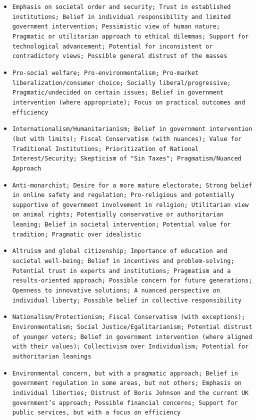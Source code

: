 \documentclass[11pt]{article}
\begin{document}
\begin{itemize}
\item \texttt{Emphasis on societal order and security; Trust in established institutions; Belief in individual responsibility and limited government intervention; Pessimistic view of human nature; Pragmatic or utilitarian approach to ethical dilemmas; Support for technological advancement; Potential for inconsistent or contradictory views; Possible general distrust of the masses}
\item \texttt{Pro-social welfare; Pro-environmentalism; Pro-market liberalization/consumer choice; Socially liberal/progressive; Pragmatic/undecided on certain issues; Belief in government intervention (where appropriate); Focus on practical outcomes and efficiency}
\item \texttt{Internationalism/Humanitarianism; Belief in government intervention (but with limits); Fiscal Conservatism (with nuances); Value for Traditional Institutions; Prioritization of National Interest/Security; Skepticism of "Sin Taxes"; Pragmatism/Nuanced Approach}
\item \texttt{Anti-monarchist; Desire for a more mature electorate; Strong belief in online safety and regulation; Pro-religious and potentially supportive of government involvement in religion; Utilitarian view on animal rights; Potentially conservative or authoritarian leaning; Belief in societal intervention; Potential value for tradition; Pragmatic over idealistic}
\item \texttt{Altruism and global citizenship; Importance of education and societal well-being; Belief in incentives and problem-solving; Potential trust in experts and institutions; Pragmatism and a results-oriented approach; Possible concern for future generations; Openness to innovative solutions; A nuanced perspective on individual liberty; Possible belief in collective responsibility}
\item \texttt{Nationalism/Protectionism; Fiscal Conservatism (with exceptions); Environmentalism; Social Justice/Egalitarianism; Potential distrust of younger voters; Belief in government intervention (where aligned with their values); Collectivism over Individualism; Potential for authoritarian leanings}
\item \texttt{Environmental concern, but with a pragmatic approach; Belief in government regulation in some areas, but not others; Emphasis on individual liberties; Distrust of Boris Johnson and the current UK government's approach; Possible financial concerns; Support for public services, but with a focus on efficiency}

\end{itemize}
\end{document}
